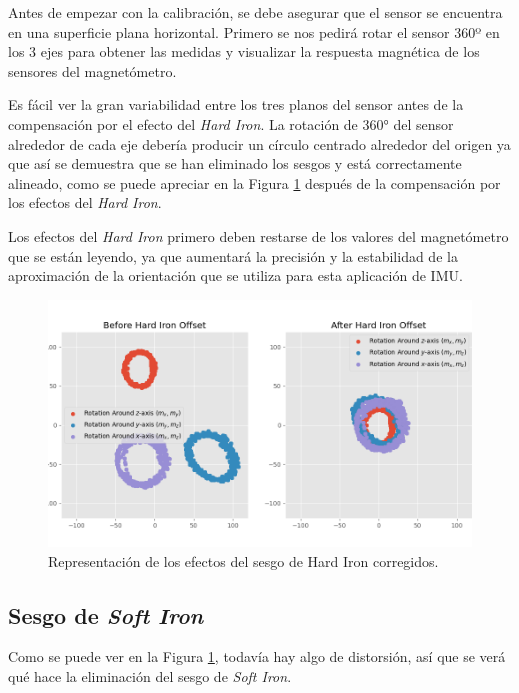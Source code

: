 Antes de empezar con la calibración, se debe asegurar que el sensor se encuentra en una superficie plana horizontal. Primero se nos pedirá rotar el sensor 360º en los 3 ejes para obtener las medidas y visualizar la respuesta magnética de los sensores del magnetómetro.

Es fácil ver la gran variabilidad entre los tres planos del sensor antes de la compensación por el efecto del \textit{Hard Iron}. La rotación de 360° del sensor alrededor de cada eje debería producir un círculo centrado alrededor del origen ya que así se demuestra que se han eliminado los sesgos y está correctamente alineado, como se puede apreciar en la Figura \ref{fig:hardiron} después de la compensación por los efectos del \textit{Hard Iron}.

Los efectos del \textit{Hard Iron} primero deben restarse de los valores del magnetómetro que se están leyendo, ya que aumentará la precisión y la estabilidad de la aproximación de la orientación que se utiliza para esta aplicación de IMU.

\begin{figure}[H]
  \centering
  \includegraphics[scale=0.6]{figs/hard_iron_calibration} %
  \caption{ Representación de los efectos del sesgo de Hard Iron corregidos.}
  \label{fig:hardiron}
\end{figure} 

\subsection{Sesgo de \textit{Soft Iron}}
\label{subsec:soft_iron}

Como se puede ver en la Figura \ref{fig:hardiron}, todavía hay algo de distorsión, así que se verá qué hace la eliminación del sesgo de \textit{Soft Iron}.

